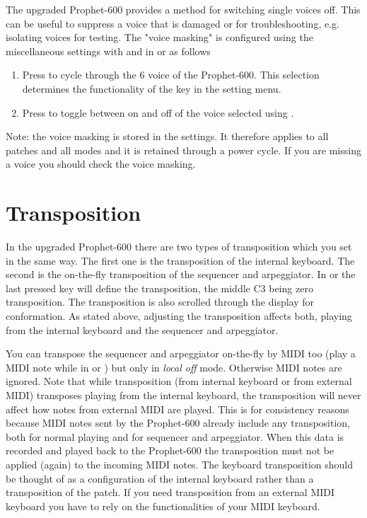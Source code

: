 \documentclass[landscape, 11pt, oneside, twoside]{report}
\newenvironment{flowtext}{\addmargin[0cm]{0cm}}{\endaddmargin} %
\begin{document}
\begin{flowtext}
The upgraded Prophet-600 provides a method for switching single voices off. This can be useful to suppress a voice that is damaged or for troubleshooting, e.g. isolating voices for testing. The "voice masking" is configured using the miscellaneous settings with  and  in \shiftmode or \shiftlock as follows
\begin{enumerate}
  \setlength\itemsep{0cm}
  \item Press  to cycle through the 6 voice of the Prophet-600. This selection determines the functionality of the key  in the setting menu.
  \item Press  to toggle between on and off of the voice selected using . 
\end{enumerate}

Note: the voice masking is stored in the settings. It therefore applies to all patches and all modes and it is retained through a power cycle. If you are missing a voice you should check the voice masking.

\section{Transposition}\label{transposition}

In the upgraded Prophet-600 there are two types of transposition which you set in the same way. The first one is the transposition of the internal keyboard. The second is the on-the-fly transposition of the sequencer and arpeggiator. In \shiftmode or \shiftlock the last pressed key will define the transposition, the middle C3 being zero transposition. The transposition is also scrolled through the display for conformation. As stated above, adjusting the transposition affects both, playing from the internal keyboard and the sequencer and arpeggiator.

You can transpose the sequencer and arpeggiator on-the-fly by MIDI too (play a MIDI note while in \shiftmode or \shiftlock) but only in \textit{local off} mode. Otherwise MIDI notes are ignored. Note that while transposition (from internal keyboard or from external MIDI) transposes playing from the internal keyboard, the transposition will never affect how notes from external MIDI are played. This is for consistency reasons because MIDI notes sent by the Prophet-600 already include any transposition, both for normal playing and for sequencer and arpeggiator. When this data is recorded and played back to the Prophet-600 the transposition must not be applied (again) to the incoming MIDI notes. The keyboard transposition should be thought of as a configuration of the internal keyboard rather than a transposition of the patch. If you need transposition from an external MIDI keyboard you have to rely on the functionalities of your MIDI keyboard. 


\end{flowtext}
\end{document}
